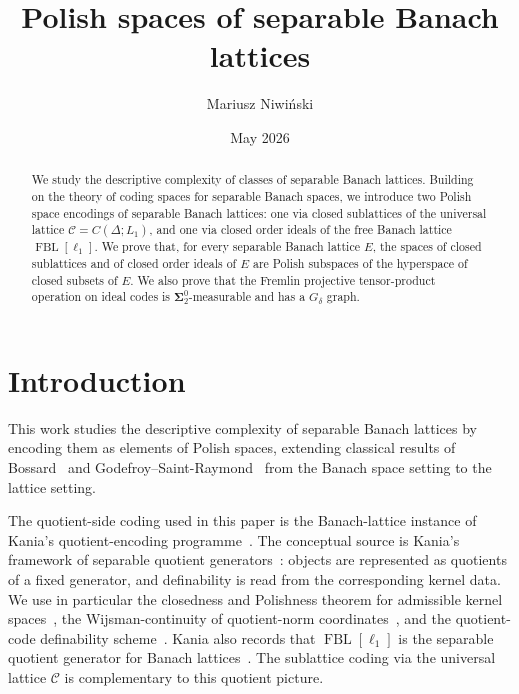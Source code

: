 \documentclass[12pt]{amsart}
\title{Polish spaces of separable Banach lattices}
\author[M.~Niwi\'nski]{Mariusz Niwi\'nski}
\date{May 2026}
\theoremstyle{plain}
\theoremstyle{definition}
\theoremstyle{remark}
\DeclareMathOperator{\FBL}{FBL}
\begin{document}
\begin{abstract}
We study the descriptive complexity of classes of separable Banach lattices.
Building on the theory of coding spaces for separable Banach spaces, we introduce
two Polish space encodings of separable Banach lattices: one via closed
sublattices of the universal lattice $\mathcal{C}=C(\Delta;L_1)$, and one via
closed order ideals of the free Banach lattice $\FBL[\ell_1]$.  We prove that,
for every separable Banach lattice $E$, the spaces of closed sublattices and of
closed order ideals of $E$ are Polish subspaces of the hyperspace of closed
subsets of $E$.  We also prove that the Fremlin projective tensor-product
operation on ideal codes is $\boldsymbol{\Sigma}^0_2$-measurable and has a
$G_\delta$ graph. %
\end{abstract}

\maketitle

\section{Introduction}

This work studies the descriptive complexity of separable Banach lattices by
encoding them as elements of Polish spaces, extending classical results of
Bossard~\cite{Boss2002Cod} and Godefroy--Saint-Raymond~\cite{God2018Cod} from
the Banach space setting to the lattice setting.

The quotient-side coding used in this paper is the Banach-lattice instance of
Kania's quotient-encoding programme~\cite{Kan2026Pol}.  The conceptual source is
Kania's framework of separable quotient generators~\cite[Definition~3.11]{Kan2026Pol}:
objects are represented as quotients of a fixed generator, and definability is
read from the corresponding kernel data.  We use in particular the closedness and
Polishness theorem for admissible kernel spaces~\cite[Proposition~3.6]{Kan2026Pol},
the Wijsman-continuity of quotient-norm coordinates~\cite[Lemma~3.8]{Kan2026Pol},
and the quotient-code definability scheme~\cite[Main Theorem~3.13 and
Theorem~3.16]{Kan2026Pol}.  Kania also records that \(\FBL[\ell_1]\) is the
separable quotient generator for Banach lattices~\cite[Remark~5.1(c)]{Kan2026Pol}.
The sublattice coding via the universal lattice \(\mathcal C\) is complementary
to this quotient picture.
\end{document}
